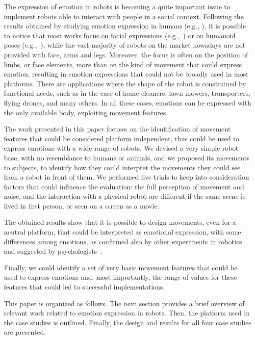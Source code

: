 The expression of emotion in robots is becoming a quite important issue to implement robots able to interact with people in a social context. Following the results obtained by studying emotion expression in humans (e.g., \cite{Venture2014,Ekman2004}), it is possible to notice that most works focus on facial expressions (e.g.,~\cite{Breazeal2002}) or on humanoid poses (e.g.,~\cite{Canamero2010}), while the vast majority of robots on the market nowadays are not provided with face, arms and legs. Moreover, the focus is often on the position of limbs, or face elements, more than on the kind of movement that could express emotion, resulting in emotion expressions that could not be broadly used in most platforms.
There are applications where the shape of the robot is constrained by functional needs, such as in the case of home cleaners, lawn mowers, transporters, flying drones, and many others. In all these cases, emotions can be expressed with the only available body, exploiting movement features.

The work presented in this paper focuses on the identification of movement features that could be considered platform independent, thus could be used to express emotions with a wide range of robots. We devised a very simple robot base, with no resemblance to humans or animals, and we proposed its movements to subjects, to identify how they could interpret the movements they could see from a robot in front of them. We performed live trials to keep into consideration factors that could influence the evaluation: the full perception of movement and noise, and the interaction with a physical robot are different if the same scene is lived in first person, or seen on a screen as a movie.

The obtained results show that it is possible to design movements, even for a neutral platform, that could be interpreted as emotional expression, with some differences among emotions, as confirmed also by other experiments in robotics~\cite{Sharma2013} and suggested by psychologists~\cite{Russell2003}.

Finally, we could identify a set of very basic movement features that could be used to express emotions and, most importantly, the range of values for these features that could led to successful implementations.

This paper is organized as follows. The next section provides a brief overview of relevant work related to emotion expression in robots. Then, the platform used in the case studies is outlined. Finally, the design and results for all four case studies are presented.
